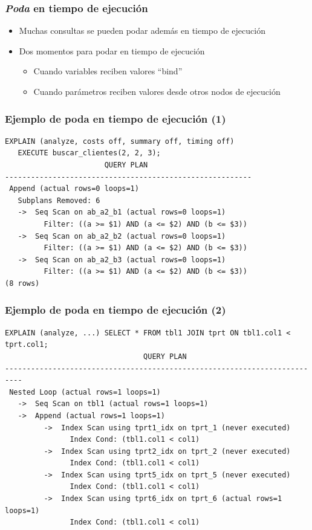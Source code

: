 \documentclass[ignorenonframetext,t]{beamer}
\begin{document}
\begin{frame}[fragile]
	\frametitle{\emph{Poda} en tiempo de ejecución}
	\begin{itemize}
		\item Muchas consultas se pueden podar además en tiempo de ejecución
		\item Dos momentos para podar en tiempo de ejecución
			\begin{itemize}
				\item Cuando variables reciben valores ``bind''
				\item Cuando parámetros reciben valores desde otros nodos de ejecución
			\end{itemize}
	\end{itemize}
\end{frame}

\begin{frame}[fragile]
	\frametitle{Ejemplo de poda en tiempo de ejecución (1)}
\footnotesize
\begin{lstlisting}
EXPLAIN (analyze, costs off, summary off, timing off)
   EXECUTE buscar_clientes(2, 2, 3);
                       QUERY PLAN                        
---------------------------------------------------------
 Append (actual rows=0 loops=1)
   Subplans Removed: 6
   ->  Seq Scan on ab_a2_b1 (actual rows=0 loops=1)
         Filter: ((a >= $1) AND (a <= $2) AND (b <= $3))
   ->  Seq Scan on ab_a2_b2 (actual rows=0 loops=1)
         Filter: ((a >= $1) AND (a <= $2) AND (b <= $3))
   ->  Seq Scan on ab_a2_b3 (actual rows=0 loops=1)
         Filter: ((a >= $1) AND (a <= $2) AND (b <= $3))
(8 rows)
\end{lstlisting}
\end{frame}

\begin{frame}[fragile]
	\frametitle{Ejemplo de poda en tiempo de ejecución (2)}
\footnotesize
\begin{lstlisting}
EXPLAIN (analyze, ...) SELECT * FROM tbl1 JOIN tprt ON tbl1.col1 < tprt.col1;
                                QUERY PLAN                                
--------------------------------------------------------------------------
 Nested Loop (actual rows=1 loops=1)
   ->  Seq Scan on tbl1 (actual rows=1 loops=1)
   ->  Append (actual rows=1 loops=1)
         ->  Index Scan using tprt1_idx on tprt_1 (never executed)
               Index Cond: (tbl1.col1 < col1)
         ->  Index Scan using tprt2_idx on tprt_2 (never executed)
               Index Cond: (tbl1.col1 < col1)
         ->  Index Scan using tprt5_idx on tprt_5 (never executed)
               Index Cond: (tbl1.col1 < col1)
         ->  Index Scan using tprt6_idx on tprt_6 (actual rows=1 loops=1)
               Index Cond: (tbl1.col1 < col1)
\end{lstlisting}
\end{frame}
\end{document}
